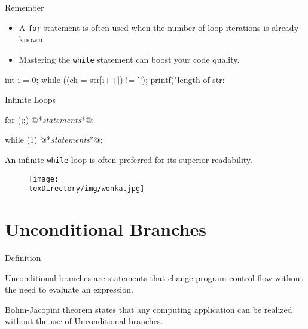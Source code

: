 \documentclass[compress]{beamer}
\begin{document}
\begin{slide}
	\begin{block}{Remember}

	\begin{itemize}
	\item[] A \texttt{for} statement is often used when the number of loop iterations is already known.
	\item[] Mastering the \texttt{while} statement can boost your code quality.
	\end{itemize}

	\begin{terminal}
	int i = 0;
	while ((ch = str[i++]) != '\0');
	printf("length of str: %
	\end{terminal}

	\end{block}
\end{slide}

\begin{slide}
	\begin{block}{Infinite Loops}

	\begin{terminal}
	for (;;) {
	    @*\textit{statements}*@;
	}
	\end{terminal}

	\begin{terminal}
	while (1) {
	    @*\textit{statements}*@;
	}
	\end{terminal}

	An infinite \texttt{while} loop is often preferred for its superior readability.

	\end{block}
\end{slide}

\begin{slide}
	\begin{figure}
	\texttt{[image: \\texDirectory/img/wonka.jpg]}
	\end{figure}
\end{slide}

\section{Unconditional Branches}

\begin{slide}
	\begin{block}{Definition}

	Unconditional branches are statements that change program control flow without the need to evaluate an expression.

	Bohm-Jacopini theorem states that any computing application can be realized without the use of Unconditional branches.

	\end{block}
\end{slide}
\end{document}
